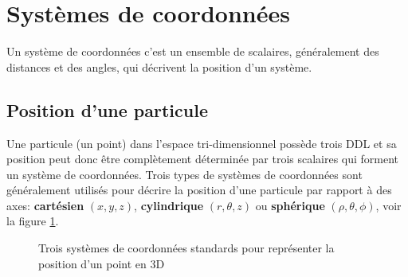 \section{Systèmes de coordonnées}
\label{sec:syscoord}

Un système de coordonnées c'est un ensemble de scalaires, généralement des distances et des angles, qui décrivent la position d'un système. 

\subsection{Position d'une particule}
\label{sec:syscoordparticule}

Une particule (un point) dans l'espace tri-dimensionnel possède trois DDL et sa position peut donc être complètement déterminée par trois scalaires qui forment un système de coordonnées. Trois types de systèmes de coordonnées sont généralement utilisés pour décrire la position d'une particule par rapport à des axes: \textbf{cartésien} $( x, y, z)$, \textbf{cylindrique} $( r, \theta, z)$ ou \textbf{sphérique} $( \rho, \theta, \phi)$, voir la figure \ref{fig:coorsys}. 

\begin{figure}[H]
        \centering
        \caption{Trois systèmes de coordonnées standards pour représenter la position d'un point en 3D}
				\label{fig:coorsys}
\end{figure}

